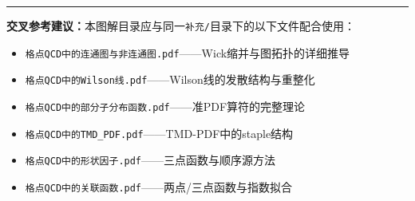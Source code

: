 \documentclass[12pt,a4paper]{ctexart}
\begin{document}
\vspace{0.5cm}
\noindent\rule{\textwidth}{0.5pt}
\small
\textbf{交叉参考建议：}本图解目录应与同一\texttt{补充/}目录下的以下文件配合使用：
\begin{itemize}[nosep]
    \item \texttt{格点QCD中的连通图与非连通图.pdf}——Wick缩并与图拓扑的详细推导
    \item \texttt{格点QCD中的Wilson线.pdf}——Wilson线的发散结构与重整化
    \item \texttt{格点QCD中的部分子分布函数.pdf}——准PDF算符的完整理论
    \item \texttt{格点QCD中的TMD\_PDF.pdf}——TMD-PDF中的staple结构
    \item \texttt{格点QCD中的形状因子.pdf}——三点函数与顺序源方法
    \item \texttt{格点QCD中的关联函数.pdf}——两点/三点函数与指数拟合
\end{itemize}
\end{document}
